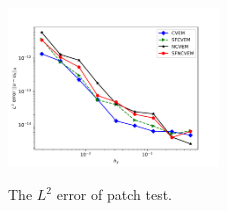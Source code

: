 \documentclass[10pt]{amsart}
\theoremstyle{definition}
\theoremstyle{remark}
\begin{document}
\begin{enumerate}[1.]
\begin{figure}[h]
\centering
{}
\includegraphics[width=2.2in]{../figures/patch_test_hy.pdf}
  \label{fig:patchtest} %
\caption{The $L^2$ error of patch test.}
\end{figure}

















 
\end{enumerate}
\end{document}
